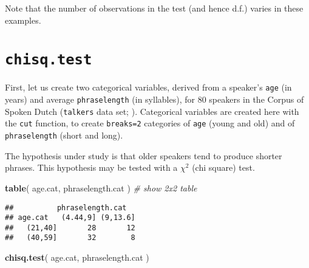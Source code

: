 \documentclass[]{book}
\newenvironment{Shaded}{\begin{snugshade}}{\end{snugshade}}
\newcommand{\CommentTok}[1]{\textcolor[rgb]{0.56,0.35,0.01}{\textit{#1}}}
\newcommand{\DataTypeTok}[1]{\textcolor[rgb]{0.13,0.29,0.53}{#1}}
\newcommand{\DecValTok}[1]{\textcolor[rgb]{0.00,0.00,0.81}{#1}}
\newcommand{\KeywordTok}[1]{\textcolor[rgb]{0.13,0.29,0.53}{\textbf{#1}}}
\newcommand{\NormalTok}[1]{#1}
\newcommand{\OperatorTok}[1]{\textcolor[rgb]{0.81,0.36,0.00}{\textbf{#1}}}
\newcommand{\StringTok}[1]{\textcolor[rgb]{0.31,0.60,0.02}{#1}}
\begin{document}
Note that the number of observations in the test (and hence d.f.)
varies in these examples.

\hypertarget{chisq.test}{%
\section{\texorpdfstring{\texttt{chisq.test}}{chisq.test}}\label{chisq.test}}

First, let us create two categorical variables, derived from a
speaker's \texttt{age} (in years) and average \texttt{phraselength} (in
syllables), for 80 speakers in the Corpus of Spoken Dutch (\texttt{talkers} data set; \citep{R-hqmisc}).
Categorical variables are created here with the
\texttt{cut} function, to create
\texttt{breaks=2} categories of \texttt{age} (young and
old) and of \texttt{phraselength} (short and long).

\begin{Shaded}
\end{Shaded}

The hypothesis under study is that older speakers tend to produce
shorter phrases. This hypothesis may be tested with a \(\chi^2\) (chi
square) test.\\

\begin{Shaded}
\begin{Highlighting}[]
\KeywordTok{table}\NormalTok{( age.cat, phraselength.cat ) }\CommentTok{# show 2x2 table}
\end{Highlighting}
\end{Shaded}

\begin{verbatim}
##          phraselength.cat
## age.cat   (4.44,9] (9,13.6]
##   (21,40]       28       12
##   (40,59]       32        8
\end{verbatim}

\begin{Shaded}
\begin{Highlighting}[]
\KeywordTok{chisq.test}\NormalTok{( age.cat, phraselength.cat ) }
\end{Highlighting}
\end{Shaded}
\end{document}
